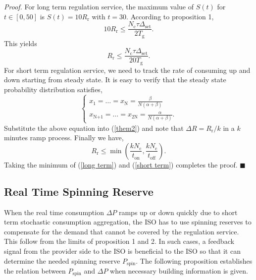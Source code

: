 \documentclass[journal]{IEEEtran}
\begin{document}
\textit{Proof.} For long term regulation service, the maximum value of $S(t)$ for $t\in[0,50]$ is $S(t)=10 R_{\textrm{r}}$ with $t=30$. According to proposition 1,
\begin{equation}
10 R_{\textrm{r}}\leq \frac{N_{\textrm{c}}\tau\Delta_{\textrm{set}}}{2T_{\textrm{g}}}.
\end{equation}
This yields
\begin{equation}
\label{long term}
R_{\textrm{r}}\leq \frac{N_{\textrm{c}}\tau\Delta_{\textrm{set}}}{20 T_{\textrm{g}}}.
\end{equation}
For short term regulation service, we need to track the rate of consuming up and down starting from steady state. It is easy to verify that the steady state probability distribution satisfies,
\begin{equation}
\left\{
\begin{array}{l}
x_{\textrm{1}}=\ldots=x_{\textrm{N}}=\frac{\displaystyle\beta}{\displaystyle N(\alpha+\beta)}\\
x_{\textrm{N+1}}=\ldots=x_{\textrm{2N}}=\frac{\displaystyle\alpha}{\displaystyle N(\alpha+\beta)}.
\end{array} \right.
\end{equation}
Substitute the above equation into (\ref{them2}) and note that $\Delta R= R_{\textrm{r}}/k$ in a $k$ minutes ramp process. Finally we have,
\begin{equation}
\label{short term}
R_{\textrm{r}}\leq \min(\frac{k N_{\textrm{c}}}{t_{\textrm{on}}},\frac{k N_{\textrm{c}}}{t_{\textrm{off}}}).
\end{equation}
Taking the minimum of (\ref{long term}) and (\ref{short term}) completes the proof. $\blacksquare$

\subsection{Real Time Spinning Reserve}
When the real time consumption $\Delta P$ ramps up or down quickly due to short term stochastic consumption aggregation, the ISO has to use spinning reserves to compensate for the demand that cannot be covered by the regulation service. This follow from the limits of proposition 1 and 2. In such cases, a feedback signal from the provider side to the ISO is beneficial to the ISO so that it can determine the needed spinning reserve $P_{\textrm{spin}}$. The following proposition establishes the relation between $P_{\textrm{spin}}$ and $\Delta P$ when necessary building information is given. 
\end{document}
